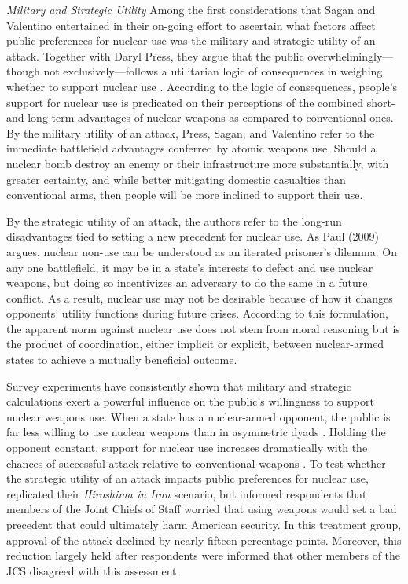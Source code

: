 \documentclass[12pt]{article}
\begin{document}
\textit{Military and Strategic Utility} Among the first considerations that Sagan and Valentino entertained in their on-going effort to ascertain what factors affect public preferences for nuclear use was the military and strategic utility of an attack. Together with Daryl Press, they argue that the public overwhelmingly—though not exclusively—follows a utilitarian logic of consequences in weighing whether to support nuclear use \citep{press_atomic_2013}. According to the logic of consequences, people's support for nuclear use is predicated on their perceptions of the combined short- and long-term advantages of nuclear weapons as compared to conventional ones. By the military utility of an attack, Press, Sagan, and Valentino refer to the immediate battlefield advantages conferred by atomic weapons use. Should a nuclear bomb destroy an enemy or their infrastructure more substantially, with greater certainty, and while better mitigating domestic casualties than conventional arms, then people will be more inclined to support their use.

By the strategic utility of an attack, the authors refer to the long-run disadvantages tied to setting a new precedent for nuclear use. As Paul (2009) argues, nuclear non-use can be understood as an iterated prisoner's dilemma. On any one battlefield, it may be in a state's interests to defect and use nuclear weapons, but doing so incentivizes an adversary to do the same in a future conflict. As a result, nuclear use may not be desirable because of how it changes opponents' utility functions during future crises. According to this formulation, the apparent norm against nuclear use does not stem from moral reasoning but is the product of coordination, either implicit or explicit, between nuclear-armed states to achieve a mutually beneficial outcome.

Survey experiments have consistently shown that military and strategic calculations exert a powerful influence on the public's willingness to support nuclear weapons use. When a state has a nuclear-armed opponent, the public is far less willing to use nuclear weapons than in asymmetric dyads \citep{haworth_what_2019,allison_under_2022, smetana_moscow_2022}. Holding the opponent constant, support for nuclear use increases dramatically with the chances of successful attack relative to conventional weapons \citep{press_atomic_2013}. To test whether the strategic utility of an attack impacts public preferences for nuclear use, \citet{sagan_atomic_2024} replicated their\textit{ Hiroshima in Iran} scenario, but informed respondents that members of the Joint Chiefs of Staff worried that using weapons would set a bad precedent that could ultimately harm American security. In this treatment group, approval of the attack declined by nearly fifteen percentage points. Moreover, this reduction largely held after respondents were informed that other members of the JCS disagreed with this assessment.
\end{document}
